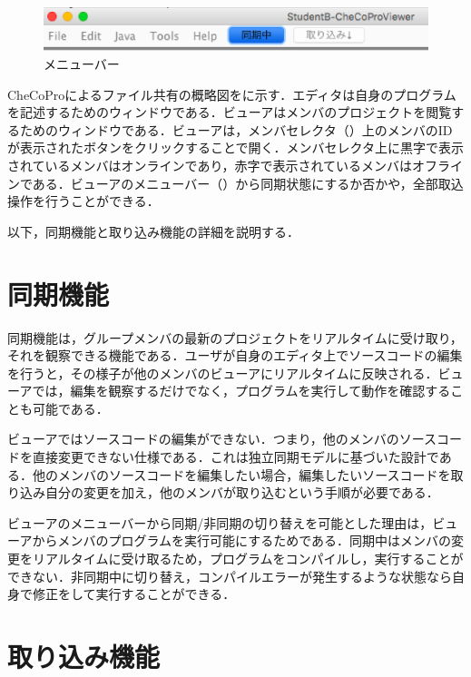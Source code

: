 \begin{figure}[tb]
	\begin{center}
		\includegraphics[width=\linewidth]{img/menu.eps}
		\caption{メニューバー}
		\label{fig:mb}
	\end{center}
\end{figure}

CheCoProによるファイル共有の概略図をに示す．エディタは自身のプログラムを記述するためのウィンドウである．ビューアはメンバのプロジェクトを閲覧するためのウィンドウである．ビューアは，メンバセレクタ（）上のメンバのIDが表示されたボタンをクリックすることで開く．メンバセレクタ上に黒字で表示されているメンバはオンラインであり，赤字で表示されているメンバはオフラインである．ビューアのメニューバー（）から同期状態にするか否かや，全部取込操作を行うことができる．

以下，同期機能と取り込み機能の詳細を説明する．


\section{同期機能}

同期機能は，グループメンバの最新のプロジェクトをリアルタイムに受け取り，それを観察できる機能である．ユーザが自身のエディタ上でソースコードの編集を行うと，その様子が他のメンバのビューアにリアルタイムに反映される．ビューアでは，編集を観察するだけでなく，プログラムを実行して動作を確認することも可能である．

ビューアではソースコードの編集ができない．つまり，他のメンバのソースコードを直接変更できない仕様である．これは独立同期モデルに基づいた設計である．他のメンバのソースコードを編集したい場合，編集したいソースコードを取り込み自分の変更を加え，他のメンバが取り込むという手順が必要である．

ビューアのメニューバーから同期/非同期の切り替えを可能とした理由は，ビューアからメンバのプログラムを実行可能にするためである．同期中はメンバの変更をリアルタイムに受け取るため，プログラムをコンパイルし，実行することができない．非同期中に切り替え，コンパイルエラーが発生するような状態なら自身で修正をして実行することができる．


\section{取り込み機能}

